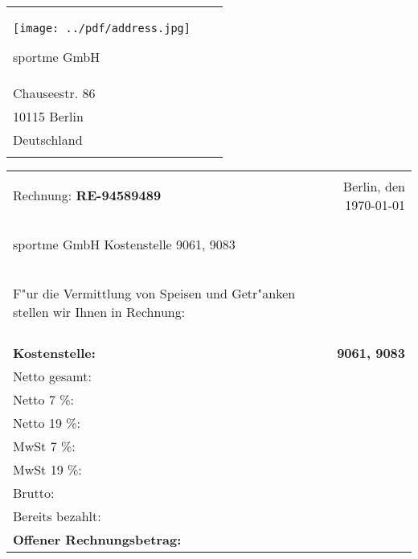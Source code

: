 \documentclass[a4paper]{article}
\begin{document}
	
		\begin{tabular}{v{0.5\textwidth}w{0.3\textwidth}r}
		\texttt{[image: ../pdf/address.jpg]}

		         	       	\textrm{sportme GmbH}\\
		         		\textrm{Chauseestr. 86}\\
				\textrm{10115 Berlin}\\
				\textrm{Deutschland}\\
				
				& \\
		\end{tabular}

            
            	\vspace{1.5cm}
	
		\begin{tabular}{v{0.7\textwidth}r}
				\begin{large}
					Rechnung: \textbf{RE-94589489}
				\end{large}
				&  Berlin, den {\today} \\
				\vspace{0.3cm}
				\begin{small}
					sportme GmbH Kostenstelle 9061, 9083
				\end{small}
				& \\
				\begin{small}
					F"ur die Vermittlung von Speisen und Getr"anken stellen wir Ihnen in Rechnung:
				\end{small}
				& \\ \\ 
				
				\color{white} \textbf{Kostenstelle:} & \color{white} \textbf{9061, 9083} \\
				
				
				Netto gesamt:		&  \\
				\hline
				Netto  7 \%:		&  \\
				Netto 19 \%:		&  \\
				MwSt 7 \%:		&  \\
				MwSt 19 \%:		&  \\
				  \hline
				Brutto:			&  \\
				  \hline
				Bereits bezahlt:		&  \\
				  \hline
				\textbf{Offener Rechnungsbetrag:}& \textbf{} \\
				  \hline  \hline
				
		\end{tabular}
		\\ \\ \\
		
\end{document}
